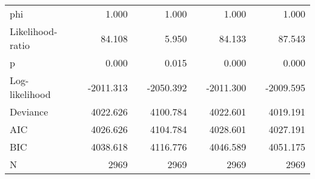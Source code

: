 \begin{tabular}{lcD{.}{.}{7}cD{.}{.}{7}cD{.}{.}{7}cD{.}{.}{7}}
phi                                &  &      1.000   &&      1.000   &&      1.000   &&      1.000  \\
Likelihood-ratio                   &  &     84.108   &&      5.950   &&     84.133   &&     87.543  \\
p                                  &  &      0.000   &&      0.015   &&      0.000   &&      0.000  \\
Log-likelihood                     &  &  -2011.313   &&  -2050.392   &&  -2011.300   &&  -2009.595  \\
Deviance                           &  &   4022.626   &&   4100.784   &&   4022.601   &&   4019.191  \\
AIC                                &  &   4026.626   &&   4104.784   &&   4028.601   &&   4027.191  \\
BIC                                &  &   4038.618   &&   4116.776   &&   4046.589   &&   4051.175  \\
N                                  &  &   2969       &&   2969       &&   2969       &&   2969      \\
\bottomrule
\end{tabular}
